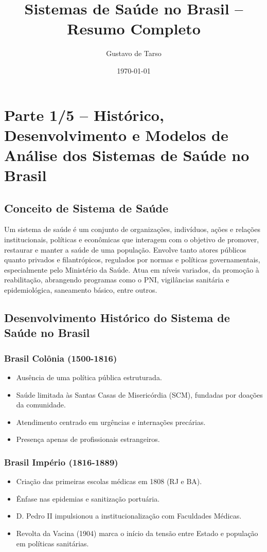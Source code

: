 \documentclass[a4paper,12pt]{article}
\author{Gustavo de Tarso}
\date{\today}
\title{Sistemas de Saúde no Brasil – Resumo Completo}
\begin{document}
\maketitle
\section{Parte 1/5 – Histórico, Desenvolvimento e Modelos de Análise dos Sistemas de Saúde no Brasil}
\label{sec:orgd265d90}

\subsection{Conceito de Sistema de Saúde}
\label{sec:orgad75a1d}
Um sistema de saúde é um conjunto de organizações, indivíduos, ações e relações institucionais, políticas e econômicas que interagem com o objetivo de promover, restaurar e manter a saúde de uma população. Envolve tanto atores públicos quanto privados e filantrópicos, regulados por normas e políticas governamentais, especialmente pelo Ministério da Saúde. Atua em níveis variados, da promoção à reabilitação, abrangendo programas como o PNI, vigilâncias sanitária e epidemiológica, saneamento básico, entre outros.
\subsection{Desenvolvimento Histórico do Sistema de Saúde no Brasil}
\label{sec:org3aa361e}

\subsubsection{Brasil Colônia (1500-1816)}
\label{sec:org64f67d3}
\begin{itemize}
\item Ausência de uma política pública estruturada.
\item Saúde limitada às Santas Casas de Misericórdia (SCM), fundadas por doações da comunidade.
\item Atendimento centrado em urgências e internações precárias.
\item Presença apenas de profissionais estrangeiros.
\end{itemize}
\subsubsection{Brasil Império (1816-1889)}
\label{sec:org90cda5d}
\begin{itemize}
\item Criação das primeiras escolas médicas em 1808 (RJ e BA).
\item Ênfase nas epidemias e sanitização portuária.
\item D. Pedro II impulsionou a institucionalização com Faculdades Médicas.
\item Revolta da Vacina (1904) marca o início da tensão entre Estado e população em políticas sanitárias.
\end{itemize}
\end{document}
